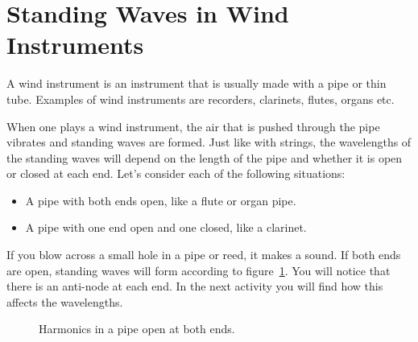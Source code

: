 \section{Standing Waves in Wind Instruments}
A wind instrument is an instrument that is usually made with a pipe or thin tube.
Examples of wind instruments are recorders, clarinets, flutes, organs etc.

When one plays a wind instrument, the air that is pushed through the pipe vibrates
and standing waves are formed. Just like with strings, the wavelengths of the standing waves
will depend on the length of the pipe and whether it is open or closed at each end. Let's
consider each of the following situations:
\begin{itemize}[noitemsep]
\item A pipe with both ends open, like a flute or organ pipe.
\item A pipe with one end open and one closed, like a clarinet.
\end{itemize}
If you blow across a small hole in a pipe or reed, it makes a sound. If both ends are open, standing waves
will form according to figure~\ref{fig:musicwaves}. You will notice that there is an anti-node at each end.
In the next activity you will find how this affects the wavelengths.

\begin{figure}[H]
\begin{center}
\caption{Harmonics in a pipe open at both ends.}\label{fig:musicwaves}
\end{center}
\end{figure}



